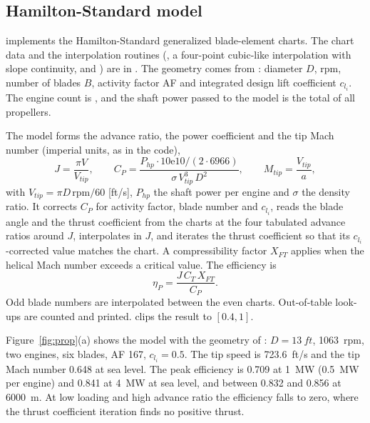 \documentclass[a4paper,11pt]{article}
\begin{document}
\subsection{Hamilton-Standard model}\label{sec:hamilton}
 implements the
Hamilton-Standard generalized blade-element charts. The chart data and the interpolation
routines (, a four-point cubic-like interpolation with slope continuity, and
) are in . The geometry comes from
: diameter $D$, rpm, number of blades $B$, activity factor AF and
integrated design lift coefficient $c_{l_i}$. The engine count is , and
the shaft power passed to the model is the total of all propellers.

The model forms the advance ratio, the power coefficient and the tip Mach number (imperial
units, as in the code),
\begin{equation}
  J = \frac{\pi V}{V_{tip}}, \qquad
  C_P = \frac{P_{hp}\cdot 10\mathrm{e}10/(2\cdot 6966)}{\sigma\,V_{tip}^3\,D^2}, \qquad
  M_{tip} = \frac{V_{tip}}{a},
\end{equation}
with $V_{tip} = \pi D\,\mathrm{rpm}/60$ [ft/s], $P_{hp}$ the shaft power per engine and $\sigma$
the density ratio. It corrects $C_P$ for activity factor, blade number and $c_{l_i}$, reads the
blade angle and the thrust coefficient from the charts at the four tabulated advance ratios
around $J$, interpolates in $J$, and iterates the thrust coefficient so that its
$c_{l_i}$-corrected value matches the chart. A compressibility factor $X_{FT}$ applies when the
helical Mach number exceeds a critical value. The efficiency is
\begin{equation}
  \eta_P = \frac{J\,C_T\,X_{FT}}{C_P}.
\end{equation}
Odd blade numbers are interpolated between the even charts. Out-of-table look-ups are counted
and printed.  clips the result to $[0.4, 1]$.

Figure~\ref{fig:prop}(a) shows the model with the geometry of
: $D = \SI{13}{ft}$, \SI{1063}{rpm}, two
engines, six blades, AF 167, $c_{l_i} = 0.5$. The tip speed is \SI{723.6}{ft/s} and the tip Mach
number 0.648 at sea level. The peak efficiency is 0.709 at \SI{1}{MW} (\SI{0.5}{MW} per engine)
and 0.841 at \SI{4}{MW} at sea level, and between 0.832 and 0.856 at \SI{6000}{m}. At low
loading and high advance ratio the efficiency falls to zero, where the thrust coefficient
iteration finds no positive thrust.
\end{document}

